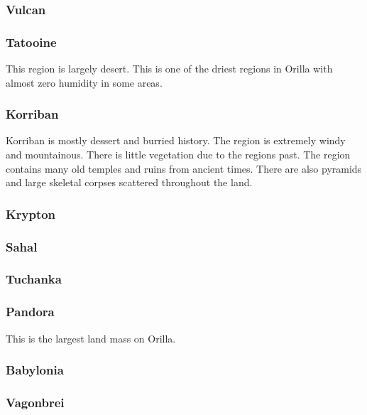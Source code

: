 \subsubsection{Vulcan}

\subsubsection{Tatooine}

This region is largely desert. This is one of the driest regions in Orilla with almost zero humidity in some areas.

\subsubsection{Korriban}

Korriban is mostly dessert and burried history. The region is extremely windy and mountainous. There is little vegetation due to the regions past. The region contains many old temples and ruins from ancient times. There are also pyramids and large skeletal corpses scattered throughout the land. 

\subsubsection{Krypton}

\subsubsection{Sahal}

\subsubsection{Tuchanka}

\subsubsection{Pandora}

This is the largest land mass on Orilla.

\subsubsection{Babylonia}

\subsubsection{Vagonbrei}

